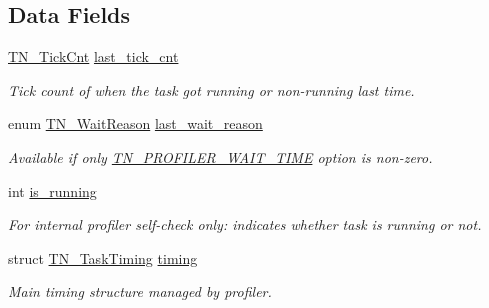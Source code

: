 \subsection*{Data Fields}
\begin{DoxyCompactItemize}
\item 
\hypertarget{struct__TN__TaskProfiler_af7e85444a89aa6d17c4eb9115fdea4fb}{\hyperlink{tn__common_8h_ac885b63d00c063de61cdbd80bf26d8aa}{T\+N\+\_\+\+Tick\+Cnt} \hyperlink{struct__TN__TaskProfiler_af7e85444a89aa6d17c4eb9115fdea4fb}{last\+\_\+tick\+\_\+cnt}}\label{struct__TN__TaskProfiler_af7e85444a89aa6d17c4eb9115fdea4fb}

\begin{DoxyCompactList}\small\item\em Tick count of when the task got running or non-\/running last time. \end{DoxyCompactList}\item 
enum \hyperlink{tn__tasks_8h_a343b0332013c15d6e878c2f60ed2c9b7}{T\+N\+\_\+\+Wait\+Reason} \hyperlink{struct__TN__TaskProfiler_aa587d29f8b4a5252547dc3144735ea55}{last\+\_\+wait\+\_\+reason}
\begin{DoxyCompactList}\small\item\em Available if only {\ttfamily \hyperlink{tn__cfg__default_8h_a1c04db5457adb54f7cc38d42b29a5ad7}{T\+N\+\_\+\+P\+R\+O\+F\+I\+L\+E\+R\+\_\+\+W\+A\+I\+T\+\_\+\+T\+I\+M\+E}} option is non-\/zero. \end{DoxyCompactList}\item 
int \hyperlink{struct__TN__TaskProfiler_a4e382a368f456602d74dad640e6371ba}{is\+\_\+running}
\begin{DoxyCompactList}\small\item\em For internal profiler self-\/check only\+: indicates whether task is running or not. \end{DoxyCompactList}\item 
struct \hyperlink{structTN__TaskTiming}{T\+N\+\_\+\+Task\+Timing} \hyperlink{struct__TN__TaskProfiler_a49e7b961e080414f407f5c52f9688ed5}{timing}
\begin{DoxyCompactList}\small\item\em Main timing structure managed by profiler. \end{DoxyCompactList}\end{DoxyCompactItemize}



